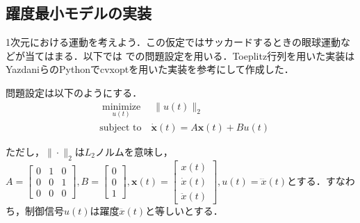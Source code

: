 \subsection{躍度最小モデルの実装}
1次元における運動を考えよう．この仮定ではサッカードするときの眼球運動などが当てはまる．以下では \cite{Yazdani2012-sx} での問題設定を用いる．Toeplitz行列を用いた実装はYazdaniらのPythonでcvxoptを用いた実装を参考にして作成した．

問題設定は以下のようにする．
$$
\begin{align}
&\underset{u(t)}{\operatorname{minimize}}\quad \|u(t)\|_2 \\
&\text{subject to} \quad \dot{\mathbf{x}}(t)=A \mathbf{x}(t)+B u(t)
\end{align}
$$

ただし，$\|\cdot\|_{2}$は$L_{2}$ノルムを意味し，$A=\left[\begin{array}{lll}0 & 1 & 0 \\ 0 & 0 & 1 \\ 0 & 0 & 0\end{array}\right], B=\left[\begin{array}{l}0 \\ 0 \\ 1\end{array}\right], \mathbf{x}(t)=\left[\begin{array}{l}x(t) \\ \dot{x}(t) \\ \ddot{x}(t)\end{array}\right], u(t)=\dddot x(t)$とする．すなわち，制御信号$u(t)$は躍度$\dddot x(t)$と等しいとする．
